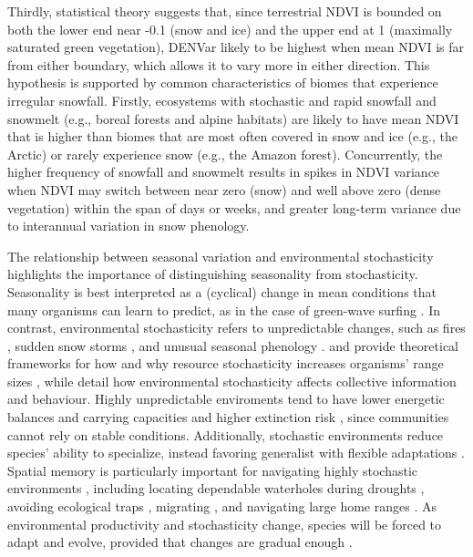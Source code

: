 \documentclass{article}
\begin{document}
Thirdly, statistical theory suggests that, since terrestrial NDVI is bounded on both the lower end near -0.1 (snow and ice) and the upper end at 1 (maximally saturated green vegetation), DENVar likely to be highest when mean NDVI is far from either boundary, which allows it to vary more in either direction. This hypothesis is supported by common characteristics of biomes that experience irregular snowfall. Firstly, ecosystems with stochastic and rapid snowfall and snowmelt (e.g., boreal forests and alpine habitats) are likely to have mean NDVI that is higher than biomes that are most often covered in snow and ice (e.g., the Arctic) or rarely experience snow (e.g., the Amazon forest). Concurrently, the higher frequency of snowfall and snowmelt results in spikes in NDVI variance when NDVI may switch between near zero (snow) and well above zero (dense vegetation) within the span of days or weeks, and greater long-term variance due to interannual variation in snow phenology.

The relationship between seasonal variation and environmental stochasticity highlights the importance of distinguishing seasonality from stochasticity. Seasonality is best interpreted as a (cyclical) change in mean conditions that many organisms can learn to predict, as in the case of green-wave surfing \citep{middleton_green-wave_2018, geremia_migrating_2019}. In contrast, environmental stochasticity refers to unpredictable changes, such as fires \citep{fettig_fire_2022, calhoun_movement_2024}, sudden snow storms \citep{aikens_pronghorn_2025}, and unusual seasonal phenology \citep{torstenson_strength_2025}. \citet{riotte-lambert_environmental_2020} and \citet{mezzini_how_2025} provide theoretical frameworks for how and why resource stochasticity increases organisms' range sizes \citep[also see][]{stephens_optimal_1982, rizzuto_forage_2021}, while \citet{oestreich_resource_2026} detail how environmental stochasticity affects collective information and behaviour. Highly unpredictable enviroments tend to have lower energetic balances and carrying capacities \citep{chevin_adaptation_2010} and higher extinction risk \citep{lande_risks_1993, fung_quantifying_2018}, since communities cannot rely on stable conditions. Additionally, stochastic environments reduce species' ability to specialize, instead favoring generalist with flexible adaptations \citep{levins_evolution_1974}. Spatial memory is particularly important for navigating highly stochastic environments \citep{steixner-kumar_strategies_2020, oestreich_resource_2026}, including locating dependable waterholes during droughts \citep{polansky_elucidating_2015}, avoiding ecological traps \citep{abrahms_memory_2019}, migrating \citep{bracis_memory_2017, rickbeil_plasticity_2019}, and navigating large home ranges \citep{falcon-cortes_hierarchical_2021, ranc_memory_2022}. As environmental productivity and stochasticity change, species will be forced to adapt and evolve, provided that changes are gradual enough \citep{levins_evolution_1974}.
\end{document}
